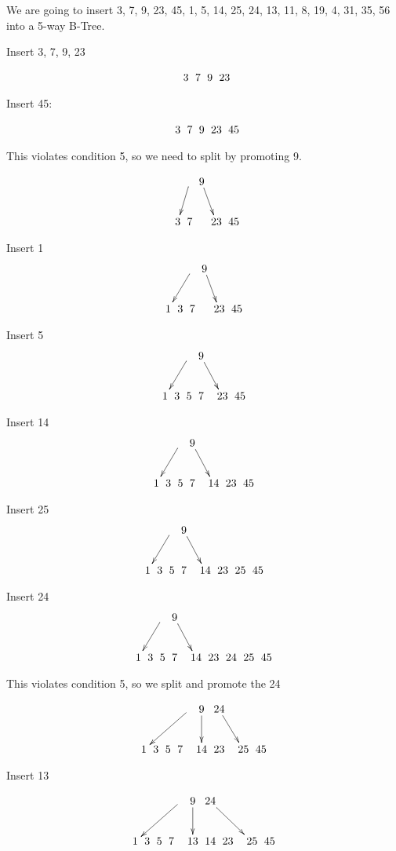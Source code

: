 \documentclass[a4paper]{article}
\begin{document}
We are going to insert 3, 7, 9, 23, 45, 1, 5, 14, 25, 24, 13, 11, 8, 19, 4, 31, 35, 56 into a 5-way B-Tree.

Insert 3, 7, 9, 23

$$\xymatrix @C=0pt {
 & 3 & 7 & 9 & 23 \\
}$$

Insert 45:

$$\xymatrix @C=0pt {
 & 3 & 7 & 9 & 23  & 45 \\
}$$

This violates condition 5, so we need to split by promoting 9.

$$\xymatrix @C=0pt {
&   &  \ar[dl] & 9 \ar[dr] &    &   \\
& 3 & 7 &   & 23  & 45 \\
}$$

Insert 1
$$\xymatrix @C=0pt {
  &   &  \ar[dll] & 9 \ar[dr] &    &   \\
1 & 3 & 7 &   & 23  & 45 \\
}$$

Insert 5
$$\xymatrix @C=0pt {
  &   &  \ar[dll] & 9 \ar[drr] &    &   \\
1 & 3 & 5 & 7 &   & 23  & 45 \\
}$$

Insert 14
$$\xymatrix @C=0pt {
  &   &  \ar[dll] & 9 \ar[drr] &    &   \\
1 & 3 & 5 & 7 &   & 14 & 23  & 45 \\
}$$

Insert 25
$$\xymatrix @C=0pt {
  &   &  \ar[dll] & 9 \ar[drr] &    &   \\
1 & 3 & 5 & 7 &   & 14 & 23 & 25 & 45 \\
}$$

Insert 24
$$\xymatrix @C=0pt {
  &   &  \ar[dll] & 9 \ar[drr] &    &   \\
1 & 3 & 5 & 7 &   & 14 & 23 & 24 & 25 & 45 \\
}$$

This violates condition 5, so we split and promote the 24

$$\xymatrix @C=0pt {
  &  &  &   &  \ar[dllll] & 9 \ar[d] &  24 \ar[drr]  &   \\
1 & 3 & 5 & 7 &   & 14 & 23 &  & 25 & 45 \\
}$$

Insert 13

$$\xymatrix @C=0pt {
  &  &  &   &  \ar[dllll] & 9 \ar[d] &  24 \ar[drrr]  &   \\
1 & 3 & 5 & 7 &   & 13 & 14 & 23 &  & 25 & 45 \\
}$$
\end{document}
